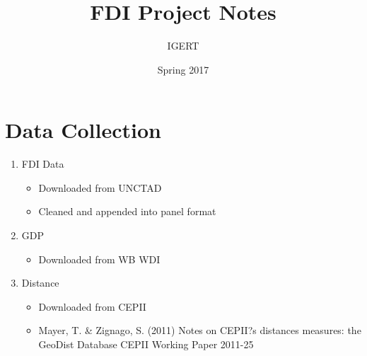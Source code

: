 \documentclass{article}
\begin{document}
\title{FDI Project Notes}
\author{IGERT}
\date{Spring 2017}
\maketitle

\section{Data Collection}



\begin{enumerate}
	\item {FDI Data}
		\begin{itemize}
			\item{Downloaded from UNCTAD}
			\item{Cleaned and appended into panel format}
		\end{itemize}
	\item {GDP}
		\begin{itemize}
			\item{Downloaded from WB WDI}
		\end{itemize}
	\item {Distance}
		\begin{itemize}
			\item{Downloaded from CEPII}
			\item{Mayer, T. \& Zignago, S. (2011) Notes on CEPII?s distances measures: the GeoDist Database
					CEPII Working Paper 2011-25}
		\end{itemize}








\end{enumerate}
\end{document}
